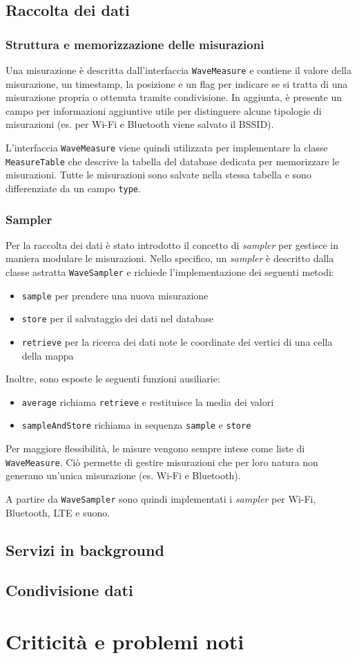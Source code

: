 \documentclass[11pt]{article}
\begin{document}
\subsection{Raccolta dei dati}

\subsubsection{Struttura e memorizzazione delle misurazioni}
Una misurazione è descritta dall'interfaccia \texttt{WaveMeasure} e contiene il valore della misurazione, un timestamp, la posizione e un flag per indicare se si tratta di una misurazione propria o ottenuta tramite condivisione. 
In aggiunta, è presente un campo per informazioni aggiuntive utile per distinguere alcune tipologie di misurazioni (es. per Wi-Fi e Bluetooth viene salvato il BSSID).

L'interfaccia \texttt{WaveMeasure} viene quindi utilizzata per implementare la classe \texttt{MeasureTable} che descrive la tabella del database dedicata per memorizzare le misurazioni. 
Tutte le misurazioni sono salvate nella stessa tabella e sono differenziate da un campo \texttt{type}.


\subsubsection{Sampler}
Per la raccolta dei dati è stato introdotto il concetto di \textit{sampler} per gestisce in maniera modulare le misurazioni.
Nello specifico, un \textit{sampler} è descritto dalla classe astratta \texttt{WaveSampler} e richiede l'implementazione dei seguenti metodi:
\begin{itemize}
    \item \texttt{sample} per prendere una nuova misurazione
    \item \texttt{store} per il salvataggio dei dati nel database
    \item \texttt{retrieve} per la ricerca dei dati note le coordinate dei vertici di una cella della mappa
\end{itemize}
Inoltre, sono esposte le seguenti funzioni ausiliarie:
\begin{itemize}
    \item \texttt{average} richiama \texttt{retrieve} e restituisce la media dei valori
    \item \texttt{sampleAndStore} richiama in sequenza \texttt{sample} e \texttt{store}
\end{itemize}
Per maggiore flessibilità, le misure vengono sempre intese come liste di \texttt{WaveMeasure}. Ciò permette di gestire misurazioni che per loro natura non generano un'unica misurazione (es. Wi-Fi e Bluetooth).

A partire da \texttt{WaveSampler} sono quindi implementati i \textit{sampler} per Wi-Fi, Bluetooth, LTE e suono.


\subsection{Servizi in background}


\subsection{Condivisione dati}


\section{Criticità e problemi noti}
\end{document}
